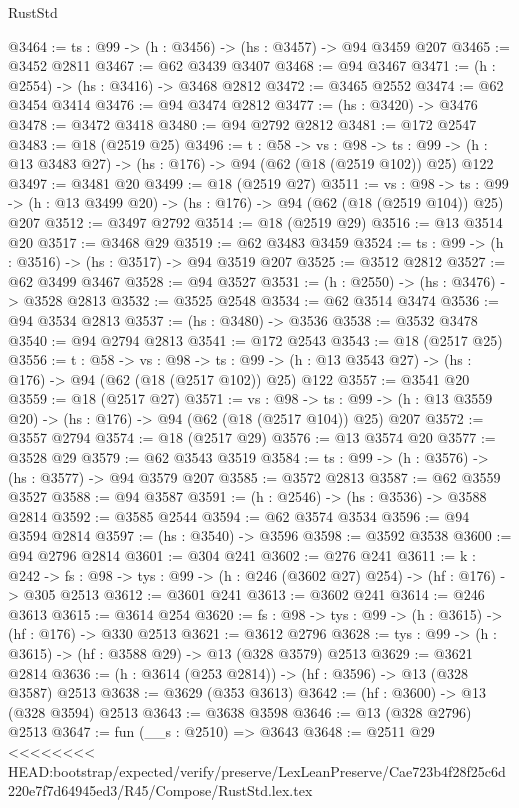 \begin{lexlean}{RustStd}
\begin{coremodule}
{\begin{coremodule}
{{{{{{@3464 := {ts : @99} -> (h : @3456) -> (hs : @3457) -> @94 @3459 @207
@3465 := @3452 @2811
@3467 := @62 @3439 @3407
@3468 := @94 @3467
@3471 := (h : @2554) -> (hs : @3416) -> @3468 @2812
@3472 := @3465 @2552
@3474 := @62 @3454 @3414
@3476 := @94 @3474 @2812
@3477 := (hs : @3420) -> @3476
@3478 := @3472 @3418
@3480 := @94 @2792 @2812
@3481 := @172 @2547
@3483 := @18 (@2519 @25)
@3496 := {t : @58} ->
  {vs : @98} ->
  {ts : @99} -> (h : @13 @3483 @27) -> (hs : @176) -> @94 (@62 (@18 (@2519 @102)) @25) @122
@3497 := @3481 @20
@3499 := @18 (@2519 @27)
@3511 := {vs : @98} ->
  {ts : @99} -> (h : @13 @3499 @20) -> (hs : @176) -> @94 (@62 (@18 (@2519 @104)) @25) @207
@3512 := @3497 @2792
@3514 := @18 (@2519 @29)
@3516 := @13 @3514 @20
@3517 := @3468 @29
@3519 := @62 @3483 @3459
@3524 := {ts : @99} -> (h : @3516) -> (hs : @3517) -> @94 @3519 @207
@3525 := @3512 @2812
@3527 := @62 @3499 @3467
@3528 := @94 @3527
@3531 := (h : @2550) -> (hs : @3476) -> @3528 @2813
@3532 := @3525 @2548
@3534 := @62 @3514 @3474
@3536 := @94 @3534 @2813
@3537 := (hs : @3480) -> @3536
@3538 := @3532 @3478
@3540 := @94 @2794 @2813
@3541 := @172 @2543
@3543 := @18 (@2517 @25)
@3556 := {t : @58} ->
  {vs : @98} ->
  {ts : @99} -> (h : @13 @3543 @27) -> (hs : @176) -> @94 (@62 (@18 (@2517 @102)) @25) @122
@3557 := @3541 @20
@3559 := @18 (@2517 @27)
@3571 := {vs : @98} ->
  {ts : @99} -> (h : @13 @3559 @20) -> (hs : @176) -> @94 (@62 (@18 (@2517 @104)) @25) @207
@3572 := @3557 @2794
@3574 := @18 (@2517 @29)
@3576 := @13 @3574 @20
@3577 := @3528 @29
@3579 := @62 @3543 @3519
@3584 := {ts : @99} -> (h : @3576) -> (hs : @3577) -> @94 @3579 @207
@3585 := @3572 @2813
@3587 := @62 @3559 @3527
@3588 := @94 @3587
@3591 := (h : @2546) -> (hs : @3536) -> @3588 @2814
@3592 := @3585 @2544
@3594 := @62 @3574 @3534
@3596 := @94 @3594 @2814
@3597 := (hs : @3540) -> @3596
@3598 := @3592 @3538
@3600 := @94 @2796 @2814
@3601 := @304 @241
@3602 := @276 @241
@3611 := {k : @242} ->
  {fs : @98} -> {tys : @99} -> (h : @246 (@3602 @27) @254) -> (hf : @176) -> @305 @2513
@3612 := @3601 @241
@3613 := @3602 @241
@3614 := @246 @3613
@3615 := @3614 @254
@3620 := {fs : @98} -> {tys : @99} -> (h : @3615) -> (hf : @176) -> @330 @2513
@3621 := @3612 @2796
@3628 := {tys : @99} -> (h : @3615) -> (hf : @3588 @29) -> @13 (@328 @3579) @2513
@3629 := @3621 @2814
@3636 := (h : @3614 (@253 @2814)) -> (hf : @3596) -> @13 (@328 @3587) @2513
@3638 := @3629 (@353 @3613)
@3642 := (hf : @3600) -> @13 (@328 @3594) @2513
@3643 := @3638 @3598
@3646 := @13 (@328 @2796) @2513
@3647 := fun (__s : @2510) => @3643
@3648 := @2511 @29
<<<<<<<< HEAD:bootstrap/expected/verify/preserve/LexLeanPreserve/Cae723b4f28f25c6d220e7f7d64945ed3/R45/Compose/RustStd.lex.tex
}}}}}}
\end{coremodule}}
\end{coremodule}
\end{lexlean}
